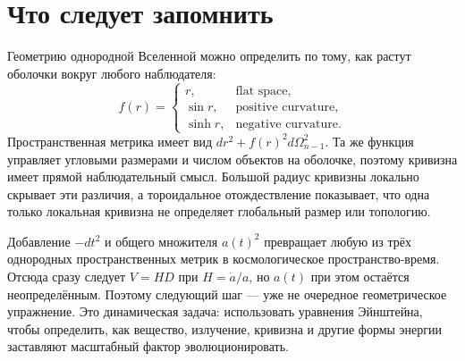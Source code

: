 \section{Что следует запомнить}

Геометрию однородной Вселенной можно определить по тому, как растут оболочки вокруг любого наблюдателя:
\begin{equation}
f(r)=
\begin{cases}
r, & \text{flat space},\\
\sin r, & \text{positive curvature},\\
\sinh r, & \text{negative curvature}.
\end{cases}
\end{equation}
Пространственная метрика имеет вид \(dr^2+f(r)^2d\Omega_{n-1}^2\). Та же функция управляет угловыми размерами и числом объектов на оболочке, поэтому кривизна имеет прямой наблюдательный смысл. Большой радиус кривизны локально скрывает эти различия, а тороидальное отождествление показывает, что одна только локальная кривизна не определяет глобальный размер или топологию.

Добавление \(-dt^2\) и общего множителя \(a(t)^2\) превращает любую из трёх однородных пространственных метрик в космологическое пространство-время. Отсюда сразу следует \(V=HD\) при \(H=\dot a/a\), но \(a(t)\) при этом остаётся неопределённым. Поэтому следующий шаг — уже не очередное геометрическое упражнение. Это динамическая задача: использовать уравнения Эйнштейна, чтобы определить, как вещество, излучение, кривизна и другие формы энергии заставляют масштабный фактор эволюционировать.
